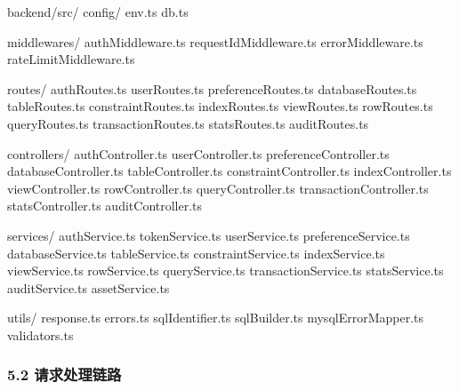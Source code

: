 \documentclass[
  a4paper,
  UTF8]{ctexart}
\newenvironment{Shaded}{}{}
\newcommand{\NormalTok}[1]{#1}
\begin{document}
\begin{Shaded}
\begin{Highlighting}[]
\NormalTok{backend/src/}
\NormalTok{  config/}
\NormalTok{    env.ts}
\NormalTok{    db.ts}

\NormalTok{  middlewares/}
\NormalTok{    authMiddleware.ts}
\NormalTok{    requestIdMiddleware.ts}
\NormalTok{    errorMiddleware.ts}
\NormalTok{    rateLimitMiddleware.ts}

\NormalTok{  routes/}
\NormalTok{    authRoutes.ts}
\NormalTok{    userRoutes.ts}
\NormalTok{    preferenceRoutes.ts}
\NormalTok{    databaseRoutes.ts}
\NormalTok{    tableRoutes.ts}
\NormalTok{    constraintRoutes.ts}
\NormalTok{    indexRoutes.ts}
\NormalTok{    viewRoutes.ts}
\NormalTok{    rowRoutes.ts}
\NormalTok{    queryRoutes.ts}
\NormalTok{    transactionRoutes.ts}
\NormalTok{    statsRoutes.ts}
\NormalTok{    auditRoutes.ts}

\NormalTok{  controllers/}
\NormalTok{    authController.ts}
\NormalTok{    userController.ts}
\NormalTok{    preferenceController.ts}
\NormalTok{    databaseController.ts}
\NormalTok{    tableController.ts}
\NormalTok{    constraintController.ts}
\NormalTok{    indexController.ts}
\NormalTok{    viewController.ts}
\NormalTok{    rowController.ts}
\NormalTok{    queryController.ts}
\NormalTok{    transactionController.ts}
\NormalTok{    statsController.ts}
\NormalTok{    auditController.ts}

\NormalTok{  services/}
\NormalTok{    authService.ts}
\NormalTok{    tokenService.ts}
\NormalTok{    userService.ts}
\NormalTok{    preferenceService.ts}
\NormalTok{    databaseService.ts}
\NormalTok{    tableService.ts}
\NormalTok{    constraintService.ts}
\NormalTok{    indexService.ts}
\NormalTok{    viewService.ts}
\NormalTok{    rowService.ts}
\NormalTok{    queryService.ts}
\NormalTok{    transactionService.ts}
\NormalTok{    statsService.ts}
\NormalTok{    auditService.ts}
\NormalTok{    assetService.ts}

\NormalTok{  utils/}
\NormalTok{    response.ts}
\NormalTok{    errors.ts}
\NormalTok{    sqlIdentifier.ts}
\NormalTok{    sqlBuilder.ts}
\NormalTok{    mysqlErrorMapper.ts}
\NormalTok{    validators.ts}
\end{Highlighting}
\end{Shaded}

\hypertarget{ux8bf7ux6c42ux5904ux7406ux94feux8def}{%
\subsubsection{5.2
请求处理链路}\label{ux8bf7ux6c42ux5904ux7406ux94feux8def}}
\end{document}
